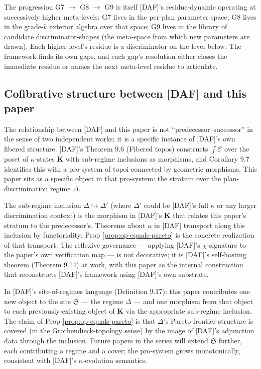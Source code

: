 The progression G7 $\to$ G8 $\to$ G9 is itself
[DAF]'s residue-dynamic operating at successively
higher meta-levels: G7 lives in the per-plan parameter
space; G8 lives in the grade-$k$ exterior algebra
over that space; G9 lives in the library of candidate
discriminator-shapes (the meta-space from which new
parameters are drawn). Each higher level's residue
is a discriminator on the level below. The framework
finds its own gaps, and each gap's resolution either
closes the immediate residue or names the next
meta-level residue to articulate.

\subsection{Cofibrative structure between [DAF] and this paper}

The relationship between [DAF] and this paper is not
``predecessor--successor'' in the sense of two independent
works; it is a specific instance of [DAF]'s own fibered
structure. [DAF]'s Theorem 9.6 (Fibered topos) constructs
$\int \mathcal{C}$ over the poset of $\kappa$-states
$\mathbf{K}$ with sub-regime inclusions as morphisms, and
Corollary 9.7 identifies this with a pro-system of topoi
connected by geometric morphisms. This paper sits as a
specific object in that pro-system: the stratum over
the plan-discrimination regime $\Delta$.

The sub-regime inclusion $\Delta \hookrightarrow \Delta'$
(where $\Delta'$ could be [DAF]'s full $\kappa$ or any
larger discrimination context) is the morphism in [DAF]'s
$\mathbf{K}$ that relates this paper's stratum to the
predecessor's. Theorems about $\kappa$ in [DAF]
transport along this inclusion by functoriality;
Prop \ref{prop:op-equals-pareto} is the concrete
realization of that transport. The reflexive governance
--- applying [DAF]'s $\chi$-signature to the paper's
own verification map --- is not decorative; it is
[DAF]'s self-hosting theorem (Theorem 9.14) at work,
with this paper as the internal construction that
reconstructs [DAF]'s framework using [DAF]'s own
substrate.

In [DAF]'s site-of-regimes language (Definition 9.17):
this paper contributes one new object to the site
$\mathfrak{S}$ --- the regime $\Delta$ --- and one
morphism from that object to each previously-existing
object of $\mathbf{K}$ via the appropriate sub-regime
inclusion. The claim of Prop \ref{prop:op-equals-pareto}
is that $\Delta$'s Pareto-frontier structure is covered
(in the Grothendieck-topology sense) by the image of
[DAF]'s adjunction data through the inclusion. Future
papers in the series will extend $\mathfrak{S}$ further,
each contributing a regime and a cover; the pro-system
grows monotonically, consistent with [DAF]'s
$\kappa$-evolution semantics.

